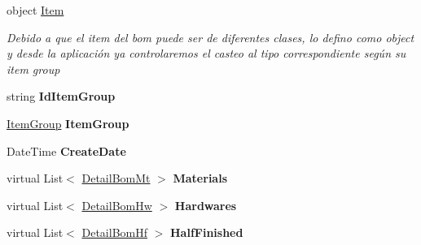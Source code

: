 \begin{DoxyCompactItemize}
\item 
object \mbox{\hyperlink{class_h_k_supply_1_1_models_1_1_item_bom_aaab4813abbe46311b7a983a01f6d2b9a}{Item}}
\begin{DoxyCompactList}\small\item\em Debido a que el item del bom puede ser de diferentes clases, lo defino como object y desde la aplicación ya controlaremos el casteo al tipo correspondiente según su item group \end{DoxyCompactList}\item 
\mbox{\label{class_h_k_supply_1_1_models_1_1_item_bom_ab42a8c5d1891d01cc2841237572b2cab}} 
string {\bfseries Id\+Item\+Group}
\item 
\mbox{\label{class_h_k_supply_1_1_models_1_1_item_bom_a204210eb0faf112821d030c5ecbe9064}} 
\mbox{\hyperlink{class_h_k_supply_1_1_models_1_1_item_group}{Item\+Group}} {\bfseries Item\+Group}
\item 
\mbox{\label{class_h_k_supply_1_1_models_1_1_item_bom_a66f69aaa186e3227c2c34a3df57762e0}} 
Date\+Time {\bfseries Create\+Date}
\item 
\mbox{\label{class_h_k_supply_1_1_models_1_1_item_bom_aa18009e3b4ba972f27335c15de099f9d}} 
virtual List$<$ \mbox{\hyperlink{class_h_k_supply_1_1_models_1_1_detail_bom_mt}{Detail\+Bom\+Mt}} $>$ {\bfseries Materials}
\item 
\mbox{\label{class_h_k_supply_1_1_models_1_1_item_bom_af8cf50ab5556031bcb47760772d932e2}} 
virtual List$<$ \mbox{\hyperlink{class_h_k_supply_1_1_models_1_1_detail_bom_hw}{Detail\+Bom\+Hw}} $>$ {\bfseries Hardwares}
\item 
\mbox{\label{class_h_k_supply_1_1_models_1_1_item_bom_a90bf8c99d6898c5967b6b74ed97ebbea}} 
virtual List$<$ \mbox{\hyperlink{class_h_k_supply_1_1_models_1_1_detail_bom_hf}{Detail\+Bom\+Hf}} $>$ {\bfseries Half\+Finished}
\end{DoxyCompactItemize}


